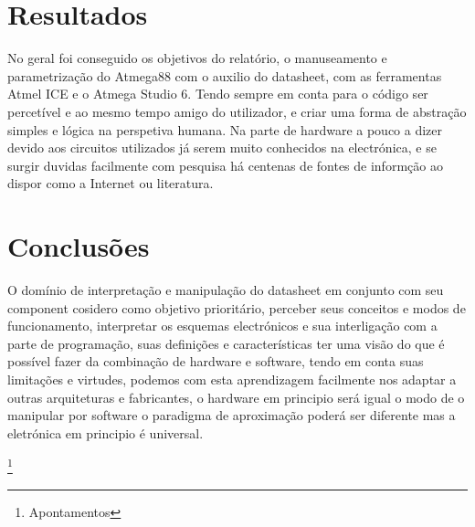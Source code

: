 \documentclass[titlepage, a4paper, 10pt, reqno, openany]{report}
\begin{document}
	\section{Resultados}
No geral foi conseguido os objetivos do relat\'{o}rio, o manuseamento e parametriza\c{c}\~{a}o do Atmega88 com o auxilio do datasheet, com as ferramentas Atmel ICE e o Atmega Studio 6.
Tendo sempre em conta para o c\'{o}digo ser percet\'{i}vel e ao mesmo tempo amigo do utilizador, e criar uma forma de abstra\c{c}\~{a}o simples e l\'{o}gica na perspetiva humana.
Na parte de hardware a pouco a dizer devido aos circuitos utilizados j\'{a} serem muito conhecidos na electr\'{o}nica, e se surgir duvidas facilmente com pesquisa h\'{a} centenas de fontes de inform\c{c}\~{a}o ao dispor como a Internet ou literatura.  

	\section{Conclus\~{o}es}
O dom\'{i}nio de interpreta\c{c}\~{a}o e manipula\c{c}\~{a}o do datasheet em conjunto com seu component cosidero como objetivo priorit\'{a}rio, perceber seus conceitos e modos de funcionamento, interpretar os esquemas electr\'{o}nicos e sua interliga\c{c}\~{a}o com a parte de programa\c{c}\~{a}o, suas defini\c{c}\~{o}es e caracter\'{i}sticas ter uma vis\~{a}o do que \'{e} poss\'{i}vel fazer da combina\c{c}\~{a}o de hardware e software, tendo em conta suas limita\c{c}\~{o}es e virtudes, podemos com esta aprendizagem facilmente nos adaptar a outras arquiteturas e fabricantes, o hardware em principio ser\'{a} igual o modo de o manipular por software o paradigma de aproxima\c{c}\~{a}o poder\'{a} ser diferente mas a eletr\'{o}nica em principio \'{e} universal.

\newpage

%
\cite{*}

%
%
\newpage
\footnote{Apontamentos}
	
\end{document}
